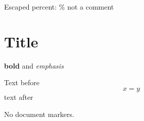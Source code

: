 Escaped percent: \% not a comment
\section{Title}
\textbf{bold} and \emph{emphasis}

Text before \[x = y\] text after

\vspace{10pt}
\medskip
\smallskip
\bigskip

No document markers.
